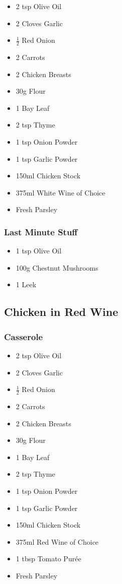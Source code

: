 \documentclass[11pt, english]{article}
\begin{document}
	\begin{itemize}
	\setlength\itemsep{0cm}
		\item 2 tsp Olive Oil
		\item 2 Cloves Garlic
		\item $\frac{1}{2}$ Red Onion
		\item 2 Carrots
		\item 2 Chicken Breasts
		\item 30g Flour
		\item 1 Bay Leaf
		\item 2 tsp Thyme
		\item 1 tsp Onion Powder
		\item 1 tsp Garlic Powder
		\item 150ml Chicken Stock
		\item 375ml White Wine of Choice
		\item Fresh Parsley
	\end{itemize}

		\subsubsection*{Last Minute Stuff}

	\begin{itemize}
	\setlength\itemsep{0cm}
		\item 1 tsp Olive Oil
		\item 100g Chestnut Mushrooms
		\item 1 Leek
	\end{itemize}

\newpage

	\subsection{Chicken in Red Wine}

		\subsubsection*{Casserole}

	\begin{itemize}
	\setlength\itemsep{0cm}
		\item 2 tsp Olive Oil
		\item 2 Cloves Garlic
		\item $\frac{1}{2}$ Red Onion
		\item 2 Carrots
		\item 2 Chicken Breasts
		\item 30g Flour
		\item 1 Bay Leaf
		\item 2 tsp Thyme
		\item 1 tsp Onion Powder
		\item 1 tsp Garlic Powder
		\item 150ml Chicken Stock
		\item 375ml Red Wine of Choice
		\item 1 tbsp Tomato Pur\'{e}e 
		\item Fresh Parsley
	\end{itemize}
\end{document}
